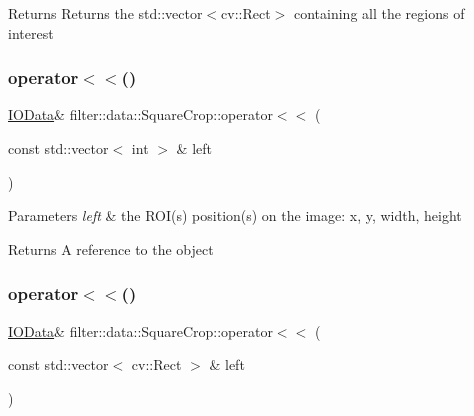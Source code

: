 \begin{DoxyReturn}{Returns}
Returns the std\+::vector$<$cv\+::\+Rect$>$ containing all the regions of interest 
\end{DoxyReturn}
\mbox{\label{classfilter_1_1data_1_1_square_crop_a8a0a3376eebb769ac09bd31a9bf12113}} 
\subsubsection{\texorpdfstring{operator$<$$<$()}{operator<<()}\hspace{0.1cm}{\footnotesize\ttfamily [1/5]}}
{\footnotesize\ttfamily \hyperlink{classfilter_1_1data_1_1_i_o_data}{I\+O\+Data}\& filter\+::data\+::\+Square\+Crop\+::operator$<$$<$ (\begin{DoxyParamCaption}\item[{const std\+::vector$<$ int $>$ \&}]{left }\end{DoxyParamCaption})\hspace{0.3cm}{\ttfamily [inline]}}


\begin{DoxyParams}{Parameters}
{\em left} & the R\+O\+I(s) position(s) on the image\+: x, y, width, height \\
\hline
\end{DoxyParams}
\begin{DoxyReturn}{Returns}
A reference to the object 
\end{DoxyReturn}
\mbox{\label{classfilter_1_1data_1_1_square_crop_a8c860c4f607cd352f102345e103d2d2a}} 
\subsubsection{\texorpdfstring{operator$<$$<$()}{operator<<()}\hspace{0.1cm}{\footnotesize\ttfamily [2/5]}}
{\footnotesize\ttfamily \hyperlink{classfilter_1_1data_1_1_i_o_data}{I\+O\+Data}\& filter\+::data\+::\+Square\+Crop\+::operator$<$$<$ (\begin{DoxyParamCaption}\item[{const std\+::vector$<$ cv\+::\+Rect $>$ \&}]{left }\end{DoxyParamCaption})\hspace{0.3cm}{\ttfamily [inline]}}


